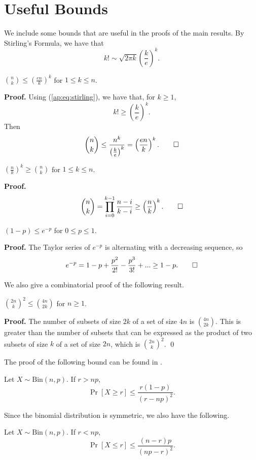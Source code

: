 \chapter{Useful Bounds}

We include some bounds that are useful in the proofs of the main results. By Stirling's Formula, we have that
\begin{equation}\label{ap:eq:stirling}
    k! \sim \sqrt{2\pi k}\left(\frac{k}{e}\right)^k.
\end{equation}

\begin{proposition}\label{ap:prop:upperbinom}
    $\binom{n}{k} \leq \left(\frac{en}{k}\right)^k$ for $1 \leq k \leq n$. 
\end{proposition}

\textbf{Proof. } Using (\ref{ap:eq:stirling}), we have that, for $k \geq 1$, 
\[k! \geq \left(\frac{k}{e}\right)^k.\]
Then
\[\binom{n}{k} \leq \frac{n^k}{\left(\frac{k}{e}\right)^k} = \left(\frac{en}{k}\right)^k. \qed\]

\begin{proposition}\label{ap:prop:lowebinom}
    $\left(\frac{n}{k}\right)^k \geq \binom{n}{k}$ for $1 \leq k \leq n$.
\end{proposition}

\textbf{Proof. }
\[\binom{n}{k} = \prod_{i = 0}^{k - 1} \frac{n - i}{k - i} \geq \left(\frac{n}{k}\right)^k. \qed\]

\begin{proposition}\label{ap:prop:exp}
    $(1 - p) \leq e^{-p}$ for $0 \leq p \leq 1$.
\end{proposition}

\textbf{Proof. } The Taylor series of $e^{-p}$ is alternating with a decreasing sequence, so
\[e^{-p} = 1 - p + \frac{p^2}{2!} - \frac{p^3}{3!} + ... \geq 1 - p. \qed\]

We also give a combinatorial proof of the following result.

\begin{proposition}\label{ap:prop:binom}
    $\binom{2n}{k}^2 \leq \binom{4n}{2k}$ for $n \geq 1$. 
\end{proposition}

\textbf{Proof. } The number of subsets of size $2k$ of a set of size $4n$ is $\binom{4n}{2k}$. This is greater than the number of subsets that can be expressed as the product of two subsets of size $k$ of a set of size $2n$, which is $\binom{2n}{k}^2$. \qed

The proof of the following bound can be found in \cite[Section 6.3]{feller}.
\begin{proposition}\label{ap:prop:rightbinomtail}
    Let $X \sim \mathrm{Bin}(n, p)$. If $r > np$,
    \[ \Pr[X \geq r] \leq \frac{r(1 - p)}{(r - np)^2}.\]
\end{proposition}
Since the binomial distribution is symmetric, we also have the following.
\begin{proposition}\label{ap:prop:leftbinomtail}
    Let $X \sim \mathrm{Bin}(n, p)$. If $r < np$,
    \[ \Pr[X \leq r] \leq \frac{(n - r)p}{(np - r)^2}.\]
\end{proposition}




